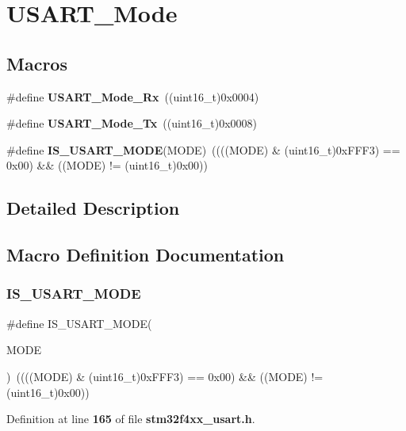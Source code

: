 \section{U\+S\+A\+R\+T\+\_\+\+Mode}
\label{group__USART__Mode}
\subsection*{Macros}
\begin{DoxyCompactItemize}
\item 
\#define \textbf{ U\+S\+A\+R\+T\+\_\+\+Mode\+\_\+\+Rx}~((uint16\+\_\+t)0x0004)
\item 
\#define \textbf{ U\+S\+A\+R\+T\+\_\+\+Mode\+\_\+\+Tx}~((uint16\+\_\+t)0x0008)
\item 
\#define \textbf{ I\+S\+\_\+\+U\+S\+A\+R\+T\+\_\+\+M\+O\+DE}(M\+O\+DE)~((((M\+O\+DE) \& (uint16\+\_\+t)0x\+F\+F\+F3) == 0x00) \&\& ((\+M\+O\+D\+E) != (uint16\+\_\+t)0x00))
\end{DoxyCompactItemize}


\subsection{Detailed Description}


\subsection{Macro Definition Documentation}
\mbox{\label{group__USART__Mode_gae9140e5ca405d2377fe0e82c79e136a2}} 
\subsubsection{I\+S\+\_\+\+U\+S\+A\+R\+T\+\_\+\+M\+O\+DE}
{\footnotesize\ttfamily \#define I\+S\+\_\+\+U\+S\+A\+R\+T\+\_\+\+M\+O\+DE(\begin{DoxyParamCaption}\item[{}]{M\+O\+DE }\end{DoxyParamCaption})~((((M\+O\+DE) \& (uint16\+\_\+t)0x\+F\+F\+F3) == 0x00) \&\& ((\+M\+O\+D\+E) != (uint16\+\_\+t)0x00))}



Definition at line \textbf{ 165} of file \textbf{ stm32f4xx\+\_\+usart.\+h}.

